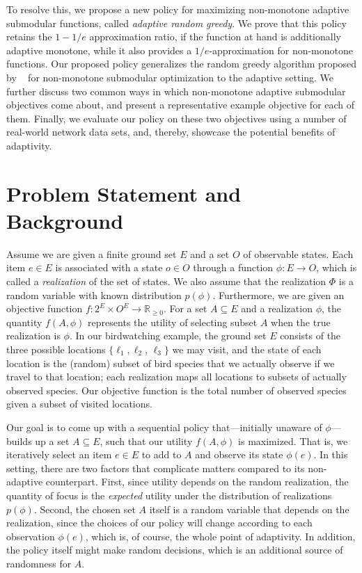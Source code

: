 \documentclass{article}
\newcommand{\citet}[1]{\citeauthor{#1}~\shortcite{#1}}
\begin{document}
To resolve this, we propose a new policy for maximizing non-monotone adaptive submodular functions, called \emph{adaptive random greedy}.
We prove that this policy retains the $1-1/e$ approximation ratio, if the function at hand is additionally adaptive monotone, while it also provides a $1/e$-approximation for non-monotone functions.
Our proposed policy generalizes the random greedy algorithm proposed by \citet{buchbinder14} for non-monotone submodular optimization to the adaptive setting.
We further discuss two common ways in which non-monotone adaptive submodular objectives come about, and present a representative example objective for each of them.
Finally, we evaluate our policy on these two objectives using a number of real-world network data sets, and, thereby, showcase the potential benefits of adaptivity.

\section{Problem Statement and Background}
Assume we are given a finite ground set $E$ and a set $O$ of observable states.
Each item $e \in E$ is associated with a state $o \in O$ through a function $\phi : E \to O$, which is called a \emph{realization} of the set of states.
We also assume that the realization $\Phi$ is a random variable with known distribution $p(\phi)$.
Furthermore, we are given an objective function $f : 2^E \times O^E \to \mathbb{R}_{\geq 0}$.
For a set $A \subseteq E$ and a realization $\phi$, the quantity $f(A, \phi)$ represents the utility of selecting subset $A$ when the true realization is $\phi$.
In our birdwatching example, the ground set $E$ consists of the three possible locations $\{\ell_1, \ell_2$, $\ell_3\}$ we may visit, and the state of each location is the (random) subset of bird species that we actually observe if we travel to that location; each realization maps all locations to subsets of actually observed species.
Our objective function is the total number of observed species given a subset of visited locations.

Our goal is to come up with a sequential policy that---initially unaware of $\phi$---builds up a set $A \subseteq E$, such that our utility $f(A, \phi)$ is maximized.
That is, we iteratively select an item $e \in E$ to add to $A$ and observe its state $\phi(e)$.
In this setting, there are two factors that complicate matters compared to its non-adaptive counterpart.
First, since utility depends on the random realization, the quantity of focus is the \emph{expected} utility under the distribution of realizations $p(\phi)$.
Second, the chosen set $A$ itself is a random variable that depends on the realization, since the choices of our policy will change according to each observation $\phi(e)$, which is, of course, the whole point of adaptivity.
In addition, the policy itself might make random decisions, which is an additional source of randomness for $A$.
\end{document}
